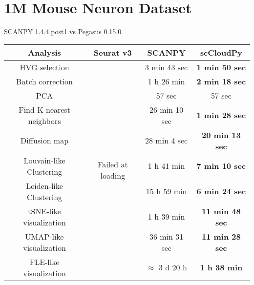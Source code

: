 \documentclass[10pt]{article}
\begin{document}
\section{1M Mouse Neuron Dataset}

\paragraph{}
SCANPY 1.4.4.post1 \qquad vs \qquad Pegasus 0.15.0

\begin{table}[H]
	\centering
	\begin{tabular}{|c|c|c|c|}
		\hline
		Analysis  & Seurat v3 & SCANPY & scCloudPy\\
		\hline \hline
		HVG selection  & \multirow{10}{*}{Failed at loading} & 3 min 43 sec  & \textbf{1 min 50 sec}  \\
		\cline{1-1}\cline{3-4}
		Batch correction  & & 1 h 26 min  & \textbf{2 min 18 sec}  \\
		\cline{1-1}\cline{3-4}
		PCA   & & 57 sec  & 57 sec  \\
		\cline{1-1}\cline{3-4}
		Find K nearest neighbors &  & 26 min 10 sec  & \textbf{1 min 28 sec}  \\
		\cline{1-1}\cline{3-4}
		Diffusion map   & & 28 min 4 sec  & \textbf{20 min 13 sec}  \\
		\cline{1-1}\cline{3-4}
		Louvain-like Clustering &  & 1 h 41 min  & \textbf{7 min 10 sec}  \\
		\cline{1-1}\cline{3-4}
		Leiden-like Clustering & & 15 h 59 min  & \textbf{6 min 24 sec}  \\
		\cline{1-1}\cline{3-4}
		tSNE-like visualization  & & 1 h 39 min  & \textbf{11 min 48 sec}  \\
		\cline{1-1}\cline{3-4}
		UMAP-like visualization  & & 36 min 31 sec   & \textbf{11 min 28 sec}  \\
		\cline{1-1}\cline{3-4}
		FLE-like visualization   & & $\approx$ 3 d 20 h  & \textbf{1 h 38 min}  \\
		\hline
	\end{tabular}
\end{table}
\end{document}
